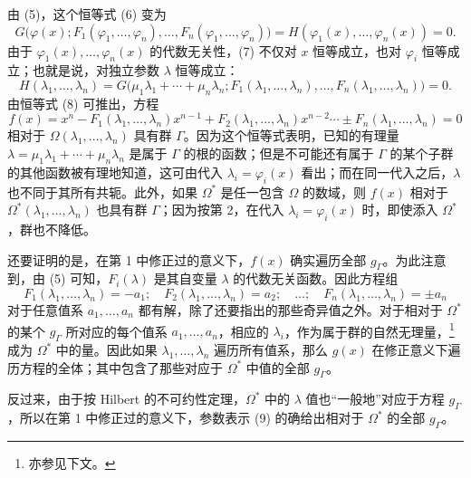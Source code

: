 由 (5)，这个恒等式 (6) 变为
\begin{equation}\tag{7}
G\bigl(\varphi(x);F_1(\varphi_1,
\ldots,\varphi_n),\ldots,F_n(\varphi_1,
\ldots,\varphi_n)\bigr)
=H(\varphi_1(x),\ldots,\varphi_n(x))=0.
\end{equation}
由于 $\varphi_1(x),\ldots,\varphi_n(x)$ 的代数无关性，(7) 不仅对 $x$ 恒等成立，也对 $\varphi_i$ 恒等成立；也就是说，对独立参数 $\lambda$ 恒等成立：
\begin{equation}\tag{8}
H(\lambda_1,
\ldots,\lambda_n)=G\bigl(\mu_1\lambda_1+\cdots+\mu_n\lambda_n;
F_1(\lambda_1,
\ldots,\lambda_n),\ldots,F_n(\lambda_1,
\ldots,\lambda_n)\bigr)=0.
\end{equation}
由恒等式 (8) 可推出，方程
\begin{equation}\tag{9}
f(x)=x^n-F_1(\lambda_1,
\ldots,\lambda_n)x^{n-1}+F_2(\lambda_1,
\ldots,\lambda_n)x^{n-2}\cdots \pm F_n(\lambda_1,
\ldots,\lambda_n)=0
\end{equation}
相对于 $\Omega(\lambda_1,
\ldots,\lambda_n)$ 具有群 $\Gamma$。因为这个恒等式表明，已知的有理量 $\lambda=\mu_1\lambda_1+\cdots+\mu_n\lambda_n$ 是属于 $\Gamma$ 的根的函数；但是不可能还有属于 $\Gamma$ 的某个子群的其他函数被有理地知道，这可由代入 $\lambda_i=\varphi_i(x)$ 看出；而在同一代入之后，$\lambda$ 也不同于其所有共轭。此外，如果 $\Omega^*$ 是任一包含 $\Omega$ 的数域，则 $f(x)$ 相对于 $\Omega^*(\lambda_1,
\ldots,\lambda_n)$ 也具有群 $\Gamma$；因为按第 2，在代入 $\lambda_i=\varphi_i(x)$ 时，即使添入 $\Omega^*$，群也不降低。

还要证明的是，在第 1 中修正过的意义下，$f(x)$ 确实遍历全部 $g_\Gamma$。为此注意到，由 (5) 可知，$F_i(\lambda)$ 是其自变量 $\lambda$ 的代数无关函数。因此方程组
\begin{equation}\tag{10}
F_1(\lambda_1,
\ldots,\lambda_n)=-a_1;\quad F_2(\lambda_1,
\ldots,\lambda_n)=a_2;\quad\ldots;\quad F_n(\lambda_1,
\ldots,\lambda_n)=\pm a_n
\end{equation}
对于任意值系 $a_1,
\ldots,a_n$ 都有解，除了还要指出的那些奇异值之外。对于相对于 $\Omega^*$ 的某个 $g_\Gamma$ 所对应的每个值系 $a_1,
\ldots,a_n$，相应的 $\lambda_i$，作为属于群的自然无理量，\footnote{亦参见下文。}成为 $\Omega^*$ 中的量。因此如果 $\lambda_1,
\ldots,\lambda_n$ 遍历所有值系，那么 $g(x)$ 在修正意义下遍历方程的全体；其中包含了那些对应于 $\Omega^*$ 中值的全部 $g_\Gamma$。

反过来，由于按 Hilbert 的不可约性定理，$\Omega^*$ 中的 $\lambda$ 值也“一般地”对应于方程 $g_\Gamma$，所以在第 1 中修正过的意义下，参数表示 (9) 的确给出相对于 $\Omega^*$ 的全部 $g_\Gamma$。

